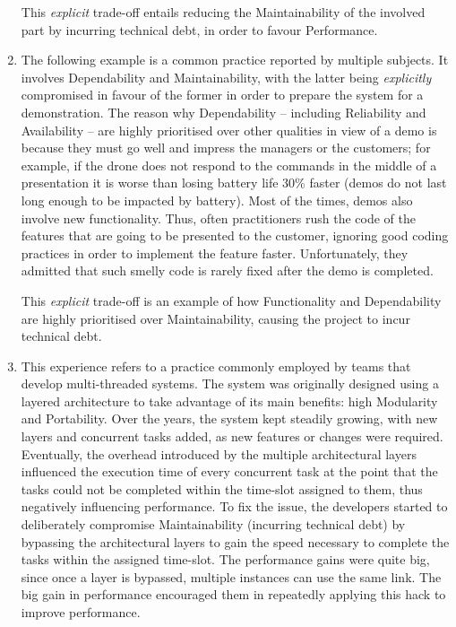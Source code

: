 \begin{enumerate}
    This \textit{explicit} trade-off entails reducing the Maintainability of the involved part by incurring technical debt, in order to favour Performance.

    \item The following example is a common practice reported by multiple subjects.
    It involves Dependability and Maintainability, with the latter being \textit{explicitly} compromised in favour of the former in order to prepare the system for a demonstration. 
    The reason why Dependability -- including Reliability and Availability -- are  highly prioritised over other qualities in view of a demo is because they must go well and impress the managers or the customers; for example, if the drone does not respond to the commands in the middle of a presentation it is worse than losing battery life 30\% faster (demos do not last long enough to be impacted by battery).
    Most of the times, demos also involve new functionality.
    Thus, often practitioners rush the code of the features that are going to be presented to the customer, ignoring good coding practices in order to implement the feature faster.
    Unfortunately, they admitted that such smelly code is rarely fixed after the demo is completed.

    This \textit{explicit} trade-off is an example of how Functionality and Dependability are highly prioritised over Maintainability, causing the project to incur technical debt.
    
    \item This experience refers to a practice commonly employed by teams that develop multi-threaded systems.
    The system was originally designed using a layered architecture to take advantage of its main benefits: high Modularity and Portability.
    Over the years, the system kept steadily growing, with new layers and concurrent tasks added, as new features or changes were required.
    Eventually, the overhead introduced by the multiple architectural layers influenced the execution time of every concurrent task at the point that the tasks could not be completed within the time-slot assigned to them, thus negatively influencing performance.
    To fix the issue, the developers started to deliberately compromise Maintainability (incurring technical debt) by bypassing the architectural layers to gain the speed necessary to complete the tasks within the assigned time-slot.
    The performance gains were quite big, since once a layer is bypassed, multiple instances can use the same link.
    The big gain in performance encouraged them in repeatedly applying this hack to improve performance.


\end{enumerate}
